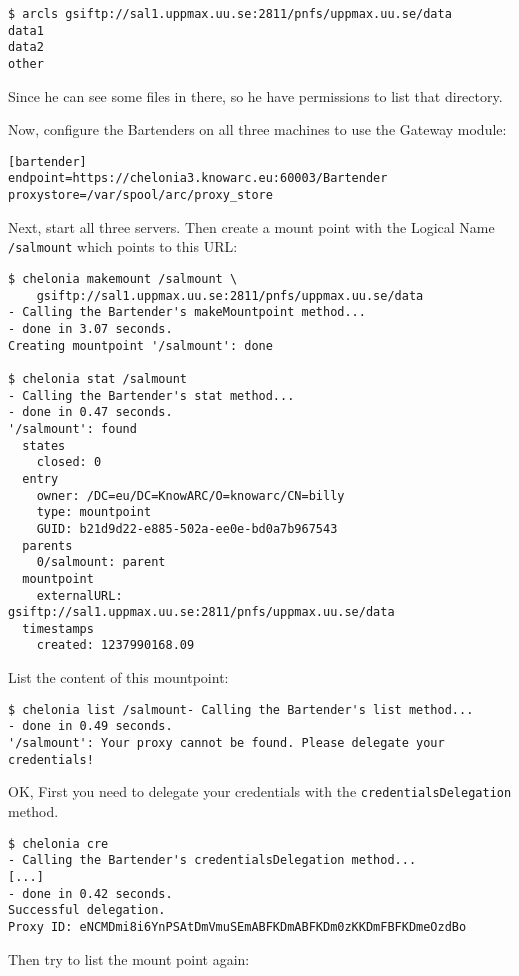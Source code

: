 \documentclass{article}
\begin{document}
\begin{verbatim}
$ arcls gsiftp://sal1.uppmax.uu.se:2811/pnfs/uppmax.uu.se/data
data1
data2
other
\end{verbatim}

Since he can see some files in there, so he have permissions to list that directory.

Now, configure the Bartenders on all three machines to use the Gateway module:

\begin{verbatim}
[bartender]
endpoint=https://chelonia3.knowarc.eu:60003/Bartender
proxystore=/var/spool/arc/proxy_store
\end{verbatim}

Next, start all three servers. Then create a mount point with the Logical Name \verb!/salmount! which points to this URL:

\begin{verbatim}
$ chelonia makemount /salmount \
    gsiftp://sal1.uppmax.uu.se:2811/pnfs/uppmax.uu.se/data
- Calling the Bartender's makeMountpoint method...
- done in 3.07 seconds.
Creating mountpoint '/salmount': done

$ chelonia stat /salmount
- Calling the Bartender's stat method...
- done in 0.47 seconds.
'/salmount': found
  states
    closed: 0
  entry
    owner: /DC=eu/DC=KnowARC/O=knowarc/CN=billy
    type: mountpoint
    GUID: b21d9d22-e885-502a-ee0e-bd0a7b967543
  parents
    0/salmount: parent
  mountpoint
    externalURL: gsiftp://sal1.uppmax.uu.se:2811/pnfs/uppmax.uu.se/data
  timestamps
    created: 1237990168.09
\end{verbatim}

List the content of this mountpoint:

\begin{verbatim}
$ chelonia list /salmount- Calling the Bartender's list method...
- done in 0.49 seconds.
'/salmount': Your proxy cannot be found. Please delegate your credentials!
\end{verbatim}

OK, First you need to delegate your credentials with the \verb!credentialsDelegation! method.

\begin{verbatim}
$ chelonia cre
- Calling the Bartender's credentialsDelegation method...
[...]
- done in 0.42 seconds.
Successful delegation.
Proxy ID: eNCMDmi8i6YnPSAtDmVmuSEmABFKDmABFKDm0zKKDmFBFKDmeOzdBo
\end{verbatim}

Then try to list the mount point again:
\end{document}
